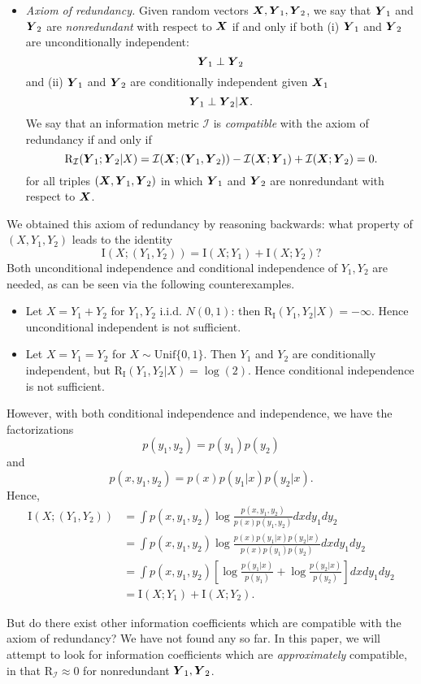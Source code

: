 \documentclass[12pt]{article}
\begin{document}
\begin{itemize}
\item \emph{Axiom of redundancy.}  
Given random vectors $\boldsymbol{X}, \boldsymbol{Y}_1, \boldsymbol{Y}_2$, we say that $\boldsymbol{Y}_1$ and
$\boldsymbol{Y}_2$ are \emph{nonredundant} with respect to $\boldsymbol{X}$ if and only if both (i) $\boldsymbol{Y}_1$ and $\boldsymbol{Y}_2$ are unconditionally independent:
\[\boldsymbol{Y}_1 \perp \boldsymbol{Y}_2\]
and (ii) $\boldsymbol{Y}_1$ and $\boldsymbol{Y}_2$ are conditionally independent given $\boldsymbol{X}_1$
\[\boldsymbol{Y}_1 \perp \boldsymbol{Y}_2 | \boldsymbol{X}.\]
We say that an information metric $\mathcal{I}$ is \emph{compatible} with the axiom of redundancy if and only if
\[
\text{R}_{\mathcal{I}}(\boldsymbol{Y}_1;\boldsymbol{Y}_2|X) = \mathcal{I}(\boldsymbol{X}; (\boldsymbol{Y}_1, \boldsymbol{Y}_2)) - \mathcal{I}(\boldsymbol{X}; \boldsymbol{Y}_1) + \mathcal{I}(\boldsymbol{X}; \boldsymbol{Y}_2) = 0.
\]
for all triples $(\boldsymbol{X}, \boldsymbol{Y}_1, \boldsymbol{Y}_2)$ in which $\boldsymbol{Y}_1$ and $\boldsymbol{Y}_2$ are
nonredundant with respect to $\boldsymbol{X}$.
\end{itemize}

We obtained this axiom of redundancy by reasoning backwards: what
property of $(X, Y_1, Y_2)$ leads to the identity
\[
\text{I}(X; (Y_1, Y_2)) = \text{I}(X; Y_1) + \text{I}(X; Y_2)?
\]
Both unconditional independence and conditional independence of $Y_1,
Y_2$ are needed, as can be seen via the following counterexamples.
\begin{itemize}
\item 
Let $X = Y_1 + Y_2$ for $Y_1, Y_2$ i.i.d. $N(0,1)$: then
$\text{R}_{\text{I}}(Y_1,Y_2|X) = -\infty$.  Hence unconditional
independent is not sufficient.
\item 
Let $X=Y_1=Y_2$ for $X \sim \text{Unif}\{0, 1\}$.  Then $Y_1$ and
$Y_2$ are conditionally independent, but
$\text{R}_{\text{I}}(Y_1,Y_2|X) = \log(2)$.  Hence conditional
independence is not sufficient.
\end{itemize}
However, with both conditional independence and independence, we have the factorizations
\[
p(y_1,y_2) = p(y_1) p(y_2)
\]
and
\[
p(x, y_1, y_2) = p(x) p(y_1|x) p(y_2|x).
\]
Hence,
\begin{align*}
\text{I}(X; (Y_1, Y_2)) &= \int p(x, y_1, y_2) \log \frac{p(x, y_1, y_2)}{p(x) p(y_1,y_2)} dx dy_1 dy_2
\\&= \int p(x, y_1, y_2) \log \frac{p(x) p(y_1|x) p(y_2|x)}{p(x) p(y_1) p(y_2)} dx dy_1 dy_2
\\&= \int p(x, y_1, y_2) \left[ \log \frac{p(y_1|x)}{p(y_1)} + \log \frac{p(y_2|x)}{p(y_2)} \right] dx dy_1 dy_2
\\&= \text{I}(X; Y_1) + \text{I}(X; Y_2).
\end{align*}

But do there exist other information coefficients which are compatible
with the axiom of redundancy?  We have not found any so far.  In this
paper, we will attempt to look for information coefficients which
are \emph{approximately} compatible, in that
$\text{R}_{\mathcal{I}} \approx 0$ for nonredundant $\boldsymbol{Y}_1, \boldsymbol{Y}_2$.
\end{document}
